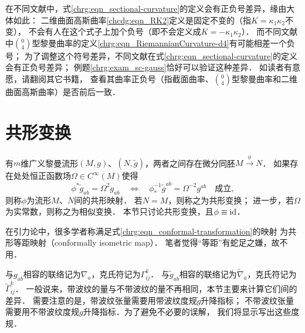 
\begin{exercise}
	在不同文献中，式\eqref{chrg:eqn_sectional-curvature}的定义会有正负号差异，缘由大体如此：
	二维曲面高斯曲率\eqref{chcdg:eqn_RK2}定义是固定不变的（指$K=\kappa_1 \kappa_2$不变），
	不会有人在这个式子上加个负号（即不会定义成$K=-\kappa_1 \kappa_2$）．
	而不同文献中$\binom{0}{4}$型黎曼曲率的定义\eqref{chrg:eqn_RiemannianCurvature-d4}有可能相差一个负号；
	为了调整这个符号差异，不同文献在式\eqref{chrg:eqn_sectional-curvature}的定义会有正负号差异；
	例题\ref{chrg:exam_sc-gauss}恰好可以验证这种差异．	如读者有意愿，请翻阅其它书籍，
	查看其曲率正负号（指截面曲率、$\binom{0}{4}$型黎曼曲率和二维曲面高斯曲率）是否前后一致．
\end{exercise}


\section{共形变换}\label{chrg:sec_conformal-transformation}
有$m$维广义黎曼流形$(M,g)$、$(N,\tilde{g})$，两者之间存在微分同胚$M\overset{\phi}{\to}N$．
如果存在处处恒正函数场$\Omega \in C^\infty(M)$使得
\begin{equation}\label{chrg:eqn_conformal-transformation}
    \phi^* \tilde{g}_{ab} = \Omega^2 g_{ab} \quad \Leftrightarrow \quad
    \phi_*^{-1}\tilde{g}^{ab} = \Omega^{-2} g^{ab}
    \quad \text{成立},
\end{equation}
则称$\phi$为流形$M$、$N$间的{\heiti 共形映射}．
若$N=M$，则称之为{\heiti 共形变换}；
进一步，若$\Omega$为实常数，则称之为{\heiti 相似变换}．
本节只讨论共形变换，且$\phi\equiv {\rm id}$．

在引力论中，很多学者称满足式\eqref{chrg:eqn_conformal-transformation}的映射
为{\kaishu 共形等距映射（conformally isometric map）}．
笔者觉得“等距”有蛇足之嫌，故不用．

与$g_{ab}$相容的联络记为$\nabla_a$，克氏符记为$\Gamma_{ij}^k$．
与$\tilde{g}_{ab}$相容的联络记为$\tilde{\nabla}_a$，克氏符记为$\tilde{\Gamma}_{ij}^k$．
一般说来，带波纹的量与不带波纹的量不再相同，本节主要来计算它们间的差异．
需要注意的是，带波纹张量需要用带波纹度规$\tilde{g}$升降指标；
不带波纹张量需要用不带波纹度规$g$升降指标．为了避免不必要的误解，
我们将显示写出这些度规．


